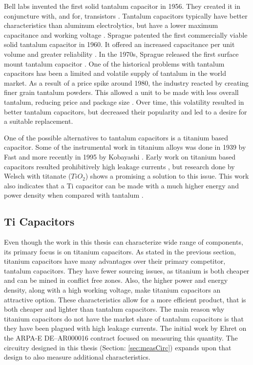 Bell labs invented the first solid tantalum capacitor in 1956. They created it in conjuncture with, and for, transistors \cite[f.~56-64]{dumInv}. Tantalum capacitors typically have better characteristics than aluminum electrolytics, but have a lower maximum capacitance and working voltage \cite{learn_caps}.
Sprague patented the first commercially viable solid tantalum capacitor in 1960. It offered an increased capacitance per unit volume and greater reliability \cite{charTant}. In the 1970s, Sprague released the first surface mount tantalum capacitor \cite{spragueHist}.
One of the historical problems with tantalum capacitors has been a limited and volatile supply of tantalum in the world market.
As a result of a price spike around 1980, the industry reacted by creating finer grain tantalum powders. This allowed a unit to be made with less overall tantalum, reducing price and package size \cite[ch~3.1]{tantMis}. Over time, this volatility resulted in better tantalum capacitors, but decreased their popularity and led to a desire for a suitable replacement.

One of the possible alternatives to tantalum capacitors is a titanium based capacitor. Some of the instrumental work in titanium alloys was done in 1939 by Fast \cite{fast1939transition} and more recently in 1995 by Kobayashi \cite{kobayashi1995mechanical}\cite{corwin2013synthesis}. Early work on titanium based capacitors resulted prohibitively high leakage currents \cite{ki2005titanium}, but research done by Welsch \cite{welsch22nd}\cite{welsch2001directionally} with titanate ($TiO_2$) shows a promising a solution to this issue. This work also indicates that a Ti capacitor can be made with a much higher energy and power density when compared with tantalum \cite{steve_thesis}.


\subsection{Ti Capacitors}

Even though the work in this thesis can characterize wide range of components, its primary focus is on titanium capacitors. As stated in the previous section, titanium capacitors have many advantages over their primary competitor, tantalum capacitors. They have fewer sourcing issues, as titanium is both cheaper and can be mined in conflict free zones. Also, the higher power and energy density, along with a high working voltage, make titanium capacitors an attractive option. These characteristics allow for a more efficient product, that is both cheaper and lighter than tantalum capacitors.  The main reason why titanium capacitors do not have the market share of tantalum capacitors is that they have been plagued with high leakage currents. The initial work by Ehret\cite{steve_thesis} on the ARPA-E DE--AR000016 contract focused on measuring this quantity. The circuitry designed in this thesis (Section: \ref{sec:measCirc}) expands upon that design to also measure additional characteristics.

